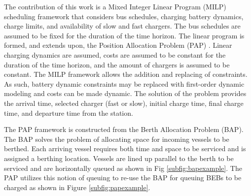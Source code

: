 \documentclass[letterpaper, 10pt, conference]{IEEEtran}
\begin{document}
The contribution of this work is a Mixed Integer Linear Program (MILP) scheduling framework that considers bus schedules, charging battery dynamics, charge limits, and availability of slow and fast chargers. The bus schedules are assumed to be fixed for the duration of the time horizon. The linear program is formed, and extends upon, the Position Allocation Problem (PAP) \cite{Qarebagh2019}. Linear charging dynamics are assumed, costs are assumed to be constant for the duration of the time horizon, and the amount of chargers is assumed to be constant. The MILP framework allows the addition and replacing of constraints. As such, battery dynamic constraints may be replaced with first-order dynamic modeling and costs can be made dynamic. The solution of the problem provides the arrival time, selected charger (fast or slow), initial charge time, final charge time, and departure time from the station.

The PAP framework is constructed from the Berth Allocation Problem (BAP). The BAP solves the problem of allocating space for incoming vessels to be berthed. Each arriving vessel requires both time and space to be serviced and is assigned a berthing location. Vessels are lined up parallel to the berth to be serviced and are horizontally queued as shown in Fig \ref{subfig:bapexample}. The PAP utilizes this notion of queuing to re-use the BAP for queuing BEBs to be charged as shown in Figure \ref{subfig:papexample}.
\end{document}
